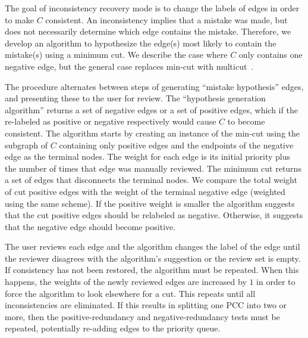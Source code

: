 The goal of inconsistency recovery mode is to change the labels of edges in
  order to make $C$ consistent.
An inconsistency implies that a mistake was made, but does not necessarily
  determine which edge contains the mistake.
Therefore, we develop an algorithm to hypothesize the edge(s) most likely to
  contain the mistake(s) using a minimum cut.
We describe the case where $C$ only contains one negative edge, but the
  general case replaces min-cut with
  multicut~\cite{vazirani_approximation_2013}.

\inconpcc{}

The procedure alternates between steps of generating ``mistake hypothesis''
  edges, and presenting these to the user for review.
The ``hypothesis generation algorithm'' returns a set of negative edges or a
  set of positive edges, which if the re-labeled as positive or negative
  respectively would cause $C$ to become consistent.
The algorithm starts by creating an instance of the min-cut using the subgraph
  of $C$ containing only positive edges and the endpoints of the negative edge
  as the terminal nodes.
The weight for each edge is its initial priority plus the number of times that
  edge was manually reviewed.
The minimum cut returns a set of edges that disconnects the terminal nodes.
We compare the total weight of cut positive edges with the weight of the
  terminal negative edge (weighted using the same scheme).
If the positive weight is smaller the algorithm suggests that the cut positive
  edges should be relabeled as negative.
Otherwise, it suggests that the negative edge should become positive.

The user reviews each edge and the algorithm changes the label of the edge
  until the reviewer disagrees with the algorithm's suggestion or the review set
  is empty.
If consistency has not been restored, the algorithm must be repeated.
When this happens, the weights of the newly reviewed edges are increased by
  $1$ in order to force the algorithm to look elsewhere for a cut.
This repeats until all inconsistencies are eliminated.
If this results in splitting one PCC into two or more, then the
  positive-redundancy and negative-redundancy tests must be repeated,
  potentially re-adding edges to the priority queue.


